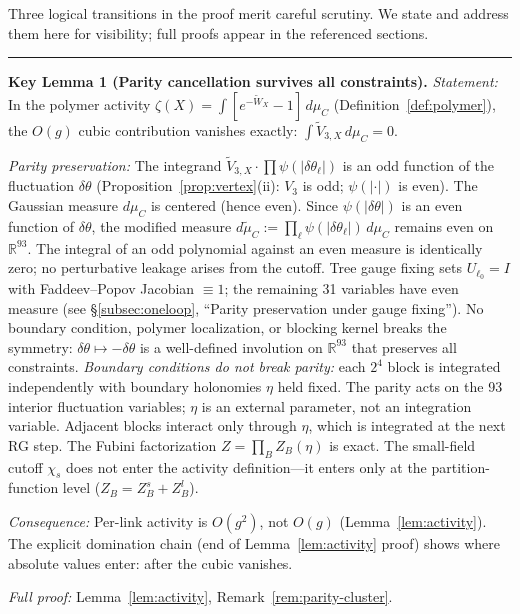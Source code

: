 \documentclass[11pt]{article}
\theoremstyle{definition}
\newcommand{\R}{\mathbb{R}}
\begin{document}
Three logical transitions in the proof merit careful scrutiny.
We state and address them here for visibility;
full proofs appear in the referenced sections.

\medskip\noindent\hrule\smallskip
\textbf{Key Lemma 1 (Parity cancellation survives all constraints).}
\emph{Statement:} In the polymer activity
$\zeta(X)=\int[e^{-\widetilde{W}_X}-1]\,d\mu_C$
(Definition~\ref{def:polymer}), the $O(g)$ cubic
contribution vanishes exactly:
$\int\widetilde{V}_{3,X}\,d\mu_C=0$.

\emph{Parity preservation:}
The integrand $\widetilde{V}_{3,X}\cdot\prod\psi(|\delta\theta_\ell|)$
is an odd function of the fluctuation $\delta\theta$
(Proposition~\ref{prop:vertex}(ii): $V_3$ is odd;
$\psi(|\cdot|)$ is even).
The Gaussian measure $d\mu_C$ is centered (hence even).
Since $\psi(|\delta\theta|)$ is an even
function of $\delta\theta$, the modified measure
$d\tilde\mu_C:=\prod_\ell\psi(|\delta\theta_\ell|)\,d\mu_C$
remains even on $\R^{93}$.  The integral
of an odd polynomial against an even measure is
identically zero; no perturbative leakage arises
from the cutoff.
Tree gauge fixing sets $U_{\ell_0}=I$ with
Faddeev--Popov Jacobian $\equiv 1$;
the remaining 31 variables have even measure
(see \S\ref{subsec:oneloop}, ``Parity preservation
under gauge fixing'').
No boundary condition, polymer localization, or
blocking kernel breaks the symmetry:
$\delta\theta\mapsto-\delta\theta$ is a well-defined
involution on $\R^{93}$ that preserves all constraints.
\emph{Boundary conditions do not break parity:}
each $2^4$ block is integrated independently with
boundary holonomies $\eta$ held fixed.
The parity acts on the 93 interior fluctuation variables;
$\eta$ is an external parameter, not an integration variable.
Adjacent blocks interact only through $\eta$, which is
integrated at the next RG step.
The Fubini factorization $Z=\prod_B Z_B(\eta)$ is exact.
The small-field cutoff $\chi_s$ does not enter
the activity definition---it enters only at the
partition-function level ($Z_B=Z_B^s+Z_B^l$).

\emph{Consequence:}
Per-link activity is $O(g^2)$, not $O(g)$
(Lemma~\ref{lem:activity}).
The explicit domination chain
(end of Lemma~\ref{lem:activity} proof)
shows where absolute values enter: after
the cubic vanishes.

\emph{Full proof:} Lemma~\ref{lem:activity},
Remark~\ref{rem:parity-cluster}.
\end{document}
